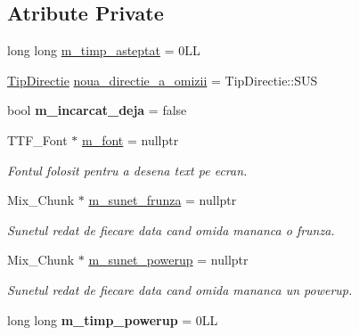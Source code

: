 \subsection*{Atribute Private}
\begin{DoxyCompactItemize}
\item 
long long \hyperlink{classJoc_a24e667d511404dd6479a86575f0969c2}{m\+\_\+timp\+\_\+asteptat} = 0\+LL
\item 
\hyperlink{main_8cpp_aea66a0d525bf9bfb9b61e9cc1ba0b752}{Tip\+Directie} \hyperlink{classJoc_af8df04a66ec45e3373dc6961b8f4a7cc}{noua\+\_\+directie\+\_\+a\+\_\+omizii} = Tip\+Directie\+::\+S\+US
\item 
\mbox{\label{classJoc_a2b74a53ec4b88eb35c25da37c4cd4bb5}} 
bool {\bfseries m\+\_\+incarcat\+\_\+deja} = false
\item 
\mbox{\label{classJoc_afda2880b237b18b8bdd4f25c5817adb4}} 
T\+T\+F\+\_\+\+Font $\ast$ \hyperlink{classJoc_afda2880b237b18b8bdd4f25c5817adb4}{m\+\_\+font} = nullptr
\begin{DoxyCompactList}\small\item\em Fontul folosit pentru a desena text pe ecran. \end{DoxyCompactList}\item 
\mbox{\label{classJoc_ac92412a0e2de93936c4c600a7efe45f4}} 
Mix\+\_\+\+Chunk $\ast$ \hyperlink{classJoc_ac92412a0e2de93936c4c600a7efe45f4}{m\+\_\+sunet\+\_\+frunza} = nullptr
\begin{DoxyCompactList}\small\item\em Sunetul redat de fiecare data cand omida mananca o frunza. \end{DoxyCompactList}\item 
\mbox{\label{classJoc_aec45d2779304b9ee3ba5c3962a66323b}} 
Mix\+\_\+\+Chunk $\ast$ \hyperlink{classJoc_aec45d2779304b9ee3ba5c3962a66323b}{m\+\_\+sunet\+\_\+powerup} = nullptr
\begin{DoxyCompactList}\small\item\em Sunetul redat de fiecare data cand omida mananca un powerup. \end{DoxyCompactList}\item 
\mbox{\label{classJoc_a5b93484b69d553174400635eb36e3042}} 
long long {\bfseries m\+\_\+timp\+\_\+powerup} = 0\+LL
\end{DoxyCompactItemize}


